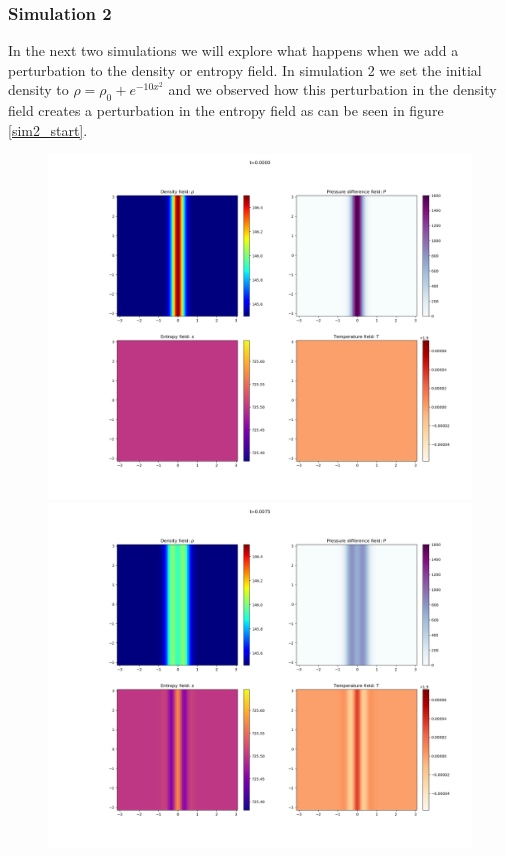 \documentclass{article}
\begin{document}
\subsubsection{Simulation 2}
In the next two simulations we will explore what happens when we add a perturbation to the density or entropy field.
In simulation 2 we set the initial density to \(\rho = \rho_0 + e^{-10x^2}\) and we observed how this perturbation in the density field creates a perturbation in the entropy field as can be seen in figure \ref{sim2_start}.

\begin{figure}[h]
    \includegraphics[width=\textwidth/3]{Sim 2/SF02_0000.png}
    \includegraphics[width=\textwidth/3]{Sim 2/SF02_0003.png}

\end{figure}
\end{document}
